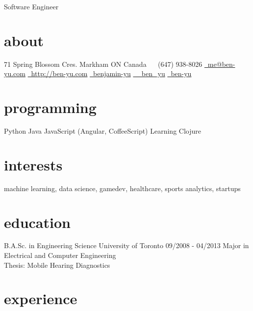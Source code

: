 \documentclass[]{friggeri-cv}
\begin{document}
       {Software Engineer}


\begin{aside}
  \section{about}
    71 Spring Blossom Cres.
    Markham ON
    Canada
    ~
    \symbolfont\faPhone\bodyfont\ (647) 938-8026
    \href{mailto:me@ben-yu.com}{\symbolfont\faEnvelope\bodyfont\ me@ben-yu.com}
    \href{http://ben-yu.com}{\symbolfont\faGlobe \bodyfont\ http://ben-yu.com}
    \href{http://www.linkedin.com/pub/benjamin-yu/20/9b0/153}{\symbolfont{\faLinkedin} \bodyfont\ benjamin-yu}
    \href{http://twitter.com/_ben_yu}{\symbolfont\faTwitter \bodyfont\ \_ben\_yu}
    \href{https://github.com/ben-yu}{\symbolfont{\faGithub} \bodyfont\ ben-yu}
  \section{programming}
    Python
    Java
    JavaScript
    (Angular, CoffeeScript)
    Learning Clojure
\end{aside}

\section{interests}

machine learning, data science, gamedev, healthcare, sports analytics, startups

\section{education}

\begin{entrylist}
  \entry
    {B.A.Sc. in Engineering Science}
    {University of Toronto}
    {09/2008 - 04/2013}
    {Major in Electrical and Computer Engineering \\
     Thesis: Mobile Hearing Diagnostics}

\end{entrylist}

\section{experience}
\end{document}

